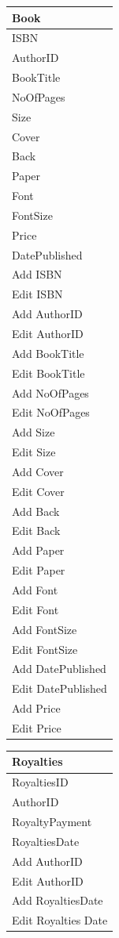 \begin{tabular}{|p{2.5cm}|}
    \hline
    \textbf{Book} \\ \hline
    ISBN \\ AuthorID \\ BookTitle \\ NoOfPages \\ Size \\ Cover \\ Back \\ Paper \\ Font \\ FontSize \\ Price \\ DatePublished \\ \hline
    Add ISBN \\ Edit ISBN \\ Add AuthorID \\ Edit AuthorID \\ Add BookTitle \\ Edit BookTitle \\ Add NoOfPages \\ Edit NoOfPages \\ Add Size \\ Edit Size \\ Add Cover \\ Edit Cover \\ Add Back \\ Edit Back \\ Add Paper \\ Edit Paper \\ Add Font \\ Edit Font \\ Add FontSize \\ Edit FontSize \\ Add DatePublished \\ Edit DatePublished \\ Add Price \\ Edit Price \\ \hline
    \hline
\end{tabular}

\begin{tabular}{|p{2.5cm}|}
    \hline
    \textbf{Royalties} \\ \hline
    RoyaltiesID \\ AuthorID \\ RoyaltyPayment \\ RoyaltiesDate \\ \hline
    Add AuthorID \\ Edit AuthorID \\ Add RoyaltiesDate \\ Edit Royalties Date \\ \hline
\end{tabular}

